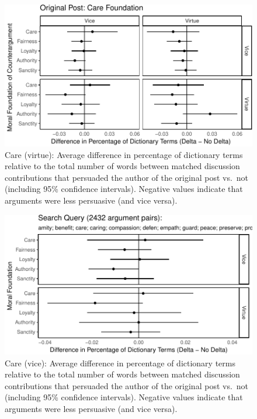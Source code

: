 \documentclass[12pt,]{article}
\begin{document}
\begin{figure}
\centering
\includegraphics{prelim_files/figure-latex/harm virtue-1.pdf}
\caption{Care (virtue): Average difference in percentage of dictionary
terms relative to the total number of words between matched discussion
contributions that persuaded the author of the original post vs.~not
(including 95\% confidence intervals). Negative values indicate that
arguments were less persuasive (and vice versa).}
\end{figure}

\begin{figure}
\centering
\includegraphics{prelim_files/figure-latex/harm vice-1.pdf}
\caption{Care (vice): Average difference in percentage of dictionary
terms relative to the total number of words between matched discussion
contributions that persuaded the author of the original post vs.~not
(including 95\% confidence intervals). Negative values indicate that
arguments were less persuasive (and vice versa).}
\end{figure}
\end{document}
